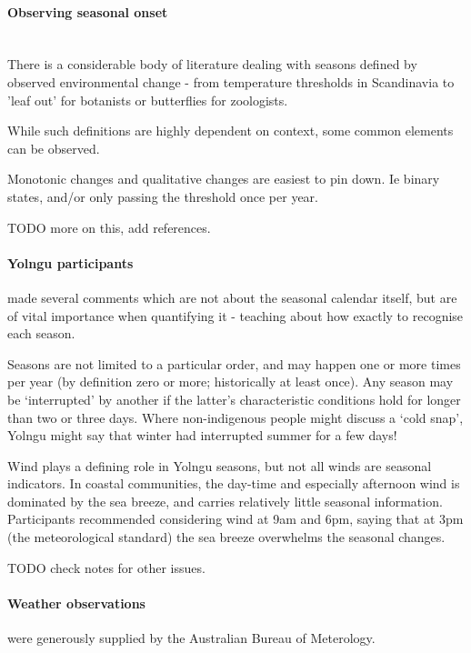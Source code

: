 \paragraph{Observing seasonal onset}~\\
There is a considerable body of literature dealing with seasons defined
by observed environmental change - from temperature thresholds in
Scandinavia to 'leaf out' for botanists or butterflies for zoologists.

While such definitions are highly dependent on context, some common
elements can be observed.  

Monotonic changes and qualitative changes are easiest to pin down.
Ie binary states, and/or only passing the threshold once per year.

TODO more on this, add references.


\paragraph{Yolngu participants} made several comments which are not about
the seasonal calendar itself, but are of vital importance when quantifying
it - teaching about how exactly to recognise each season.

Seasons are not limited to a particular order, and may happen one or more
times per year (by definition zero or more; historically at least once).
Any season may be `interrupted' by another if the latter's characteristic
conditions hold for longer than two or three days.
Where non-indigenous people might discuss a `cold snap', Yolngu might
say that winter had interrupted summer for a few days!

Wind plays a defining role in Yolngu seasons, but not all winds are
seasonal indicators.  In coastal communities, the day-time and especially
afternoon wind is dominated by the sea breeze, and carries relatively little
seasonal information.  Participants recommended considering wind at 9am
and 6pm, saying that at 3pm (the meteorological standard) the sea breeze
overwhelms the seasonal changes.

TODO check notes for other issues.


\paragraph{Weather observations} were generously supplied by the
Australian Bureau of Meterology.

